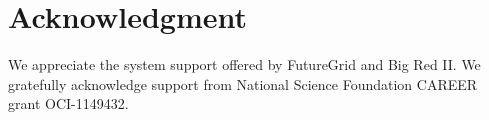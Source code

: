 \documentclass[conference]{IEEEtran}
\begin{document}
\section*{Acknowledgment}
We appreciate the system support offered by FutureGrid and Big Red II. We gratefully acknowledge support from National Science Foundation CAREER grant OCI-1149432.






\end{document}
